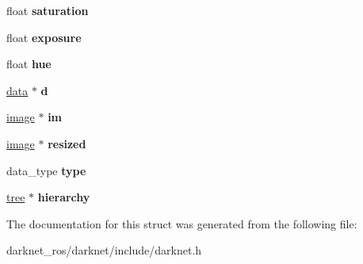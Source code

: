 \begin{DoxyCompactItemize}
float {\bfseries saturation}
\item 
\mbox{\label{structload__args_a3db966b80533d8c5003372710f9e8632}} 
float {\bfseries exposure}
\item 
\mbox{\label{structload__args_a37e3681f1edc871b1e15432f08d00114}} 
float {\bfseries hue}
\item 
\mbox{\label{structload__args_a0b1c4f762d67a0f0cbcc1241cfa5463d}} 
\hyperlink{structdata}{data} $\ast$ {\bfseries d}
\item 
\mbox{\label{structload__args_ac821b75a2e615c801b67a73911dd0134}} 
\hyperlink{structimage}{image} $\ast$ {\bfseries im}
\item 
\mbox{\label{structload__args_aa9dc3e3e93a6031df60420a5cb36c508}} 
\hyperlink{structimage}{image} $\ast$ {\bfseries resized}
\item 
\mbox{\label{structload__args_a281729b932cef85bb4e2a88e1133518d}} 
data\+\_\+type {\bfseries type}
\item 
\mbox{\label{structload__args_a2c1866cf8b94474f3f8416a1e0f0cf91}} 
\hyperlink{structtree}{tree} $\ast$ {\bfseries hierarchy}
\end{DoxyCompactItemize}


The documentation for this struct was generated from the following file\+:\begin{DoxyCompactItemize}
\item 
darknet\+\_\+ros/darknet/include/darknet.\+h\end{DoxyCompactItemize}
